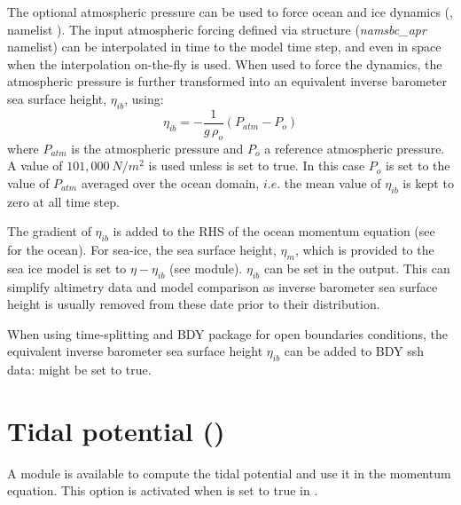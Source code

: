 \documentclass[../tex_main/NEMO_manual]{subfiles}
\begin{document}
The optional atmospheric pressure can be used to force ocean and ice dynamics 
(, \textit{} namelist ).
The input atmospheric forcing defined via  structure (\textit{namsbc\_apr} namelist) 
can be interpolated in time to the model time step, and even in space when the 
interpolation on-the-fly is used. When used to force the dynamics, the atmospheric 
pressure is further transformed into an equivalent inverse barometer sea surface height, 
$\eta_{ib}$, using:
\begin{equation} \label{eq:SBC_ssh_ib}
	\eta_{ib} = -  \frac{1}{g\,\rho_o}  \left( P_{atm} - P_o \right) 
\end{equation}
where $P_{atm}$ is the atmospheric pressure and $P_o$ a reference atmospheric pressure.
A value of $101,000~N/m^2$ is used unless  is set to true. In this case $P_o$ 
is set to the value of $P_{atm}$ averaged over the ocean domain, $i.e.$ the mean value of 
$\eta_{ib}$ is kept to zero at all time step.

The gradient of $\eta_{ib}$ is added to the RHS of the ocean momentum equation 
(see  for the ocean). For sea-ice, the sea surface height, $\eta_m$, 
which is provided to the sea ice model is set to $\eta - \eta_{ib}$ (see  module).
$\eta_{ib}$ can be set in the output. This can simplify altimetry data and model comparison 
as inverse barometer sea surface height is usually removed from these date prior to their distribution.

When using time-splitting and BDY package for open boundaries conditions, the equivalent 
inverse barometer sea surface height $\eta_{ib}$ can be added to BDY ssh data: 
  might be set to true.

\section{Tidal potential (\protect{})}
\label{sec:SBC_tide}


A module is available to compute the tidal potential and use it in the momentum equation.
This option is activated when  is set to true in .
\end{document}

